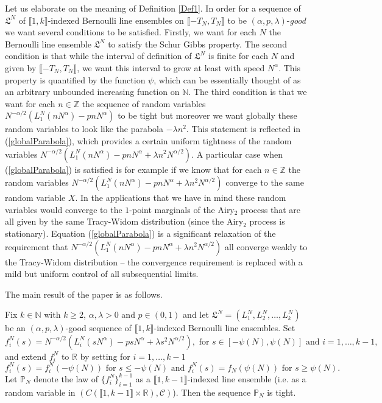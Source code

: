 \begin{remark} Let us elaborate on the meaning of Definition \ref{Def1}. In order for a sequence of $\mathfrak{L}^N $ of $\llbracket 1, k \rrbracket$-indexed Bernoulli line ensembles on $ \llbracket -T_N, T_N \rrbracket$ to be $(\alpha,p,\lambda)$-{\em good} we want several conditions to be satisfied. Firstly, we want for each $N$ the Bernoulli line ensemble $\mathfrak{L}^N$ to satisfy the Schur Gibbs property. The second condition is that while the interval of definition of $\mathfrak{L}^N$ is finite for each $N$ and given by $\llbracket -T_N, T_N \rrbracket$, we want this interval to grow at least with speed $N^{\alpha}$. This property is quantified by the function $\psi$, which can be essentially thought of as an arbitrary unbounded increasing function on $\mathbb{N}$. The third condition is that we want for each $n \in \mathbb{Z}$ the sequence of random variables $N^{-\alpha/2}(L_1^N(n N^{\alpha}) - p n N^{\alpha})$ to be tight but moreover we want globally these random variables to look like the parabola $-\lambda n^2$. This statement is reflected in (\ref{globalParabola}), which provides a certain uniform tightness of the random variables $N^{-\alpha/2}(L_1^N(n N^{\alpha}) - p n N^{\alpha} + \lambda n^2 N^{\alpha/2}) $. A particular case when (\ref{globalParabola}) is satisfied is for example if we know that  for each $n \in \mathbb{Z}$ the random variables $N^{-\alpha/2}(L_1^N(n N^{\alpha}) - p n N^{\alpha} + \lambda n^2 N^{\alpha/2})$ converge to the same random variable $X$. In the applications that we have in mind these random variables would converge to the $1$-point marginals of the Airy$_2$ process that are all given by the same Tracy-Widom distribution (since the Airy$_2$ process is stationary). Equation (\ref{globalParabola}) is a significant relaxation of the requirement that $N^{-\alpha/2}(L_1^N(n N^{\alpha}) - p n N^{\alpha} + \lambda n^2 N^{\alpha/2})$ all converge weakly to the Tracy-Widom distribution -- the convergence requirement is replaced with a mild but uniform control of all subsequential limits.
\end{remark}

The main result of the paper is as follows.
\begin{theorem}\label{PropTightGood}
Fix $k \in \mathbb{N}$ with $k \geq 2$, $\alpha, \lambda > 0$ and $p \in (0,1)$ and let $\mathfrak{L}^N = (L^N_1, L^N_2, \dots, L^N_k)$ be an $(\alpha, p, \lambda)$-good sequence of $\llbracket 1, k \rrbracket$-indexed Bernoulli line ensembles.  Set
$$f^N_i(s) =  N^{-\alpha/2}(L^N_i(sN^{\alpha}) - p s N^{\alpha} + \lambda s^2 N^{\alpha/2}), \mbox{ for $s\in [-\psi(N) ,\psi(N)]$ and $i = 1,\dots, k -1$,}$$
and extend $f^N_i$ to $\mathbb{R}$ by setting for $i = 1, \dots, k - 1$
$$f^N_i(s) = f^N_i(-\psi(N)) \mbox{ for $s \leq -\psi(N)$ and } f^N_i(s) = f_N(\psi(N)) \mbox{ for $s \geq \psi(N)$}.$$
Let $\mathbb{P}_N$ denote the law of $\{f^N_i\}_{i = 1}^{k-1}$ as a $\llbracket 1, k-1 \rrbracket$-indexed line ensemble (i.e. as a random variable in $(C( \llbracket 1, k -1 \rrbracket \times \mathbb{R}), \mathcal{C})$). Then the sequence $\mathbb{P}_N$ is tight.
\end{theorem}

